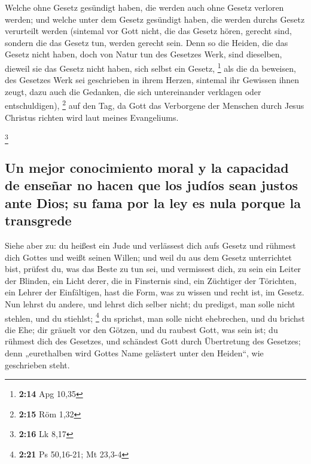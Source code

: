  Welche ohne Gesetz gesündigt haben, die werden auch ohne
Gesetz verloren werden; und welche unter dem Gesetz gesündigt haben, die
werden durchs Gesetz verurteilt werden  (sintemal vor
Gott nicht, die das Gesetz hören, gerecht sind, sondern die das Gesetz
tun, werden gerecht sein.  Denn so die Heiden, die das
Gesetz nicht haben, doch von Natur tun des Gesetzes Werk, sind
dieselben, dieweil sie das Gesetz nicht haben, sich selbst ein Gesetz,
\footnote{\textbf{2:14} Apg 10,35}  als die da beweisen,
des Gesetzes Werk sei geschrieben in ihrem Herzen, sintemal ihr Gewissen
ihnen zeugt, dazu auch die Gedanken, die sich untereinander verklagen
oder entschuldigen), \footnote{\textbf{2:15} Röm 1,32} 
auf den Tag, da Gott das Verborgene der Menschen durch Jesus Christus
richten wird laut meines Evangeliums.

\footnote{\textbf{2:16} Lk 8,17}

\hypertarget{un-mejor-conocimiento-moral-y-la-capacidad-de-enseuxf1ar-no-hacen-que-los-juduxedos-sean-justos-ante-dios-su-fama-por-la-ley-es-nula-porque-la-transgrede}{%
\subsection{Un mejor conocimiento moral y la capacidad de enseñar no
hacen que los judíos sean justos ante Dios; su fama por la ley es nula
porque la
transgrede}\label{un-mejor-conocimiento-moral-y-la-capacidad-de-enseuxf1ar-no-hacen-que-los-juduxedos-sean-justos-ante-dios-su-fama-por-la-ley-es-nula-porque-la-transgrede}}

 Siehe aber zu: du heißest ein Jude und verlässest dich
aufs Gesetz und rühmest dich Gottes  und weißt seinen
Willen; und weil du aus dem Gesetz unterrichtet bist, prüfest du, was
das Beste zu tun sei,  und vermissest dich, zu sein ein
Leiter der Blinden, ein Licht derer, die in Finsternis sind,
 ein Züchtiger der Törichten, ein Lehrer der Einfältigen,
hast die Form, was zu wissen und recht ist, im Gesetz. 
Nun lehrst du andere, und lehrst dich selber nicht; du predigst, man
solle nicht stehlen, und du stiehlst; \footnote{\textbf{2:21} Ps
  50,16-21; Mt 23,3-4}  du sprichst, man solle nicht
ehebrechen, und du brichst die Ehe; dir gräuelt vor den Götzen, und du
raubest Gott, was sein ist;  du rühmest dich des
Gesetzes, und schändest Gott durch Übertretung des Gesetzes;
 denn „eurethalben wird Gottes Name gelästert unter den
Heiden``, wie geschrieben steht.

